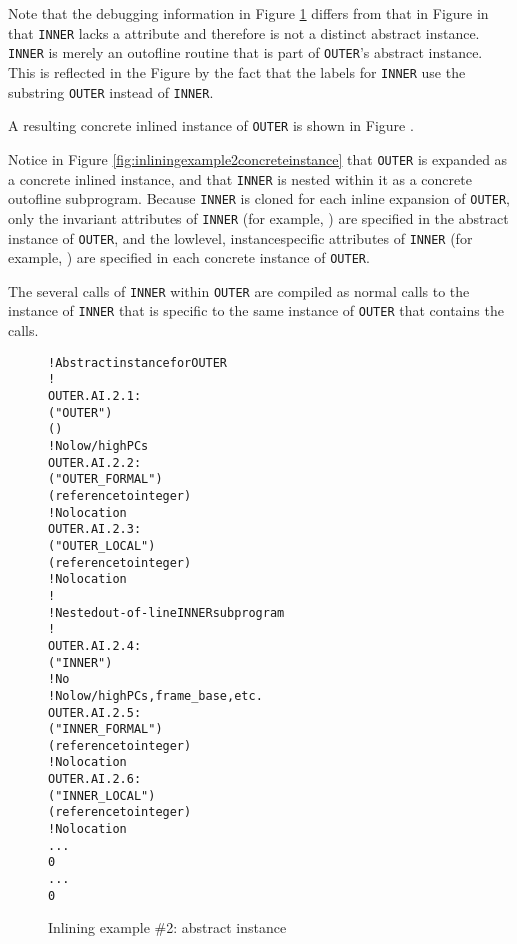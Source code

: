 Note that the debugging information in 
Figure \ref{fig:inliningexample2abstractinstance}
differs from that in 
Figure 
in that \texttt{INNER} lacks a 
\DWATinline{} attribute
and therefore is not a distinct abstract instance. \texttt{INNER}
is merely an out\dash of\dash line routine that is part of \texttt{OUTER}\textquoteright s
abstract instance. This is reflected in the Figure by
the fact that the labels for \texttt{INNER} use the substring \texttt{OUTER}
instead of \texttt{INNER}.

A resulting 
concrete inlined instance of \texttt{OUTER} is shown in
Figure .

Notice in 
Figure \ref{fig:inliningexample2concreteinstance}
that \texttt{OUTER} is expanded as a concrete
inlined instance, and that \texttt{INNER} is nested within it as a
concrete out\dash of\dash line subprogram. Because \texttt{INNER} is cloned
for each inline expansion of \texttt{OUTER}, only the invariant
attributes of \texttt{INNER} 
(for example, \DWATname) are specified
in the abstract instance of \texttt{OUTER}, and the low\dash level,
instance\dash specific attributes of \texttt{INNER} (for example,
\DWATlowpc) are specified in 
each concrete instance of \texttt{OUTER}.

The several calls of \texttt{INNER} within \texttt{OUTER} are compiled as normal
calls to the instance of \texttt{INNER} that is specific to the same
instance of \texttt{OUTER} that contains the calls.

\begin{figure}[t]
\begin{dwflisting}
\begin{alltt}
    ! Abstract instance for OUTER
    ! 
OUTER.AI.2.1:
    \DWTAGsubprogram
        \DWATname("OUTER")
        \DWATinline(\DWINLdeclaredinlined)
        ! No low/high PCs
OUTER.AI.2.2:
        \DWTAGformalparameter
            \DWATname("OUTER\_FORMAL")
            \DWATtype(reference to integer)
            ! No location
OUTER.AI.2.3:
        \DWTAGvariable
            \DWATname("OUTER\_LOCAL")
            \DWATtype(reference to integer)
            ! No location
        !
        ! Nested out-of-line INNER subprogram
        !
OUTER.AI.2.4:
        \DWTAGsubprogram
            \DWATname("INNER")
            ! No \DWATinline
            ! No low/high PCs, frame\_base, etc.
OUTER.AI.2.5:
            \DWTAGformalparameter
                \DWATname("INNER\_FORMAL")
                \DWATtype(reference to integer)
                ! No location
OUTER.AI.2.6:
            \DWTAGvariable
                \DWATname("INNER\_LOCAL")
                \DWATtype(reference to integer)
                ! No location
            ...
            0
        ...
        0
\end{alltt}
\end{dwflisting}
\caption{Inlining example \#2: abstract instance}
\label{fig:inliningexample2abstractinstance}
\end{figure}

